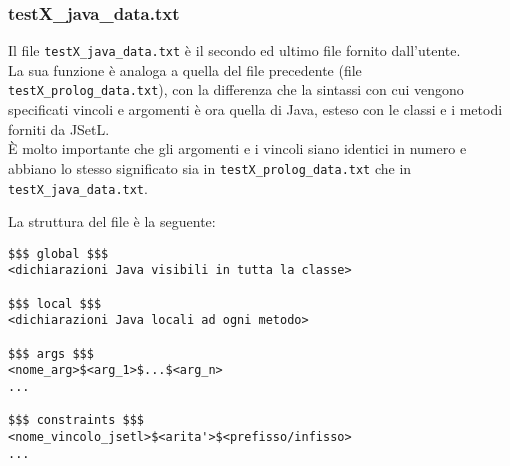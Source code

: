 \subsubsection{testX\_java\_data.txt}
Il file \texttt{testX\_java\_data.txt} è il secondo ed ultimo file fornito dall'utente.\\
La sua funzione è analoga a quella del file precedente (file \texttt{testX\_prolog\_data.txt}), con la differenza che la sintassi con cui vengono specificati vincoli e argomenti è ora quella di Java, esteso con le classi e i metodi forniti da JSetL.\\
È molto importante che gli argomenti e i vincoli siano identici in numero e abbiano lo stesso significato sia in \texttt{testX\_prolog\_data.txt} che in \texttt{testX\_java\_data.txt}.\\

\clearpage

La struttura del file è la seguente:\\
\begin{lstlisting}
$$$ global $$$
<dichiarazioni Java visibili in tutta la classe>

$$$ local $$$
<dichiarazioni Java locali ad ogni metodo>

$$$ args $$$
<nome_arg>$<arg_1>$...$<arg_n>
...

$$$ constraints $$$
<nome_vincolo_jsetl>$<arita'>$<prefisso/infisso>
...
\end{lstlisting}


